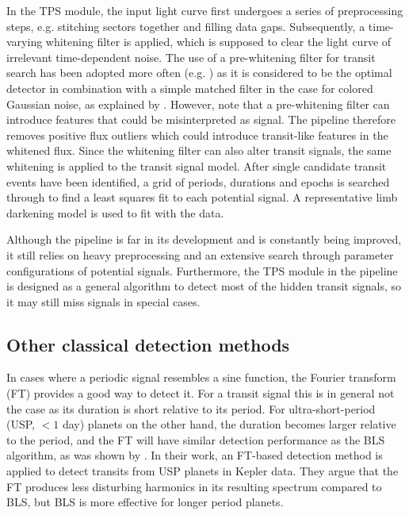 In the TPS module, the input light curve first undergoes a series of preprocessing steps, e.g. stitching sectors together and filling data gaps. Subsequently, a time-varying whitening filter is applied, which is supposed to clear the light curve of irrelevant time-dependent noise. The use of a pre-whitening filter for transit search has been adopted more often (e.g. \citealp{carpano2003detecting}) as it is considered to be the optimal detector in combination with a simple matched filter in the case for colored Gaussian noise, as explained by \cite{jenkins2002impact}. However, \cite{rodenbeck2018revisiting} note that a pre-whitening filter can introduce features that could be misinterpreted as signal. The pipeline therefore removes positive flux outliers which could introduce transit-like features in the whitened flux. Since the whitening filter can also alter transit signals, the same whitening is applied to the transit signal model. After single candidate transit events have been identified, a grid of periods, durations and epochs is searched through to find a least squares fit to each potential signal. A representative limb darkening model is used to fit with the data.

Although the pipeline is far in its development and is constantly being improved, it still relies on heavy preprocessing and an extensive search through parameter configurations of potential signals. Furthermore, the TPS module in the pipeline is designed as a general algorithm to detect most of the hidden transit signals, so it may still miss signals in special cases.

\subsection{Other classical detection methods}

In cases where a periodic signal resembles a sine function, the Fourier transform (FT) provides a good way to detect it. For a transit signal this is in general not the case as its duration is short relative to its period. For ultra-short-period (USP, $< 1$ day) planets on the other hand, the duration becomes larger relative to the period, and the FT will have similar detection performance as the BLS algorithm, as was shown by \cite{sanchis2014study}. In their work, an FT-based detection method is applied to detect transits from USP planets in Kepler data. They argue that the FT produces less disturbing harmonics in its resulting spectrum compared to BLS, but BLS is more effective for longer period planets. 

